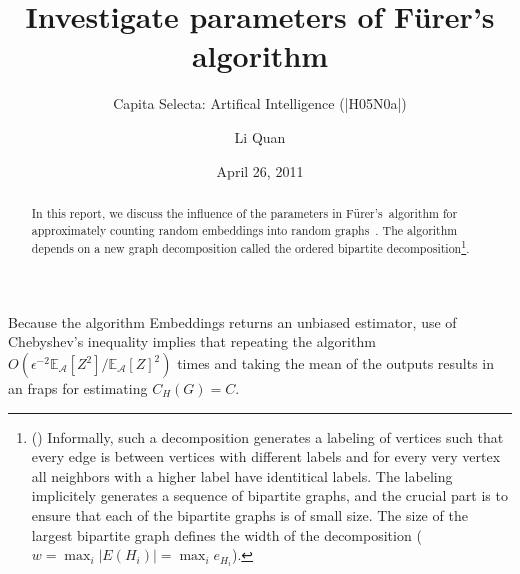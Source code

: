 \documentclass[a4paper,english,12pt,]{scrartcl}
\title{Investigate parameters of F\"urer's algorithm}
\subtitle{Capita Selecta: Artifical Intelligence (|H05N0a|)}
\author{Li Quan}
\date{April 26, 2011}
\begin{document}
\maketitle
\begin{abstract}
 In this report, we discuss the influence of the parameters in F\"urer's~algorithm for approximately counting random embeddings into random graphs~\cite{Furer:2008:ACE:1429791.1429826}. 
The algorithm depends on a new graph decomposition called the ordered bipartite decomposition\footnote{(\cite{Furer:2008:ACE:1429791.1429826}) Informally, such a decomposition generates a labeling of vertices such that every edge is between vertices with different labels and for every very vertex all neighbors with a higher label have identitical labels.
The labeling implicitely generates a sequence of bipartite graphs, and the crucial part is to ensure that each of the bipartite graphs is of small size.  The size of the largest bipartite graph defines the width of the decomposition ($w= \max_i |E(H_i)| = \max_i e_{H_i}$).}.
\end{abstract}


% 
Because the algorithm Embeddings returns an unbiased estimator, use of Chebyshev's inequality implies that repeating the algorithm $O(\epsilon^{-2}\mathds{E}_\mathcal{A}[Z^2]/\mathds{E}_\mathcal{A}[Z]^2)$ times and taking the mean of the outputs results in an fraps for estimating $C_H(G)=C$. 
\end{document}
